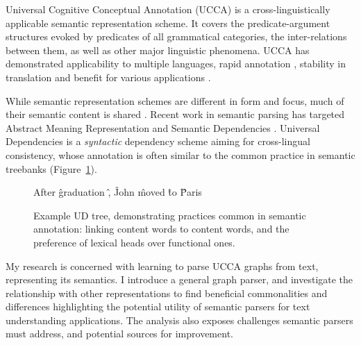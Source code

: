 \documentclass[12pt]{report}
\begin{document}
Universal Cognitive Conceptual Annotation (UCCA)
is a cross-linguistically applicable semantic representation scheme.
It covers the predicate-argument
structures evoked by predicates of all grammatical categories, the inter-relations between them,
as well as other major linguistic phenomena.
UCCA has demonstrated applicability to multiple languages,
rapid annotation \cite{abend2017uccaapp},
stability in translation \cite{sulem2015conceptual}
and benefit for various applications
\cite{birch2016hume,choshen2018usim,sulem2018samsa,sulem2018simple}.

While semantic representation schemes are different in form and focus,
much of their semantic content is shared \cite{abend2017state}.
Recent work in semantic parsing has targeted
Abstract Meaning Representation \cite{banarescu2013abstract} and
Semantic Dependencies \cite{oepen2016towards}.
Universal Dependencies \cite{nivre2016universal}
is a \textit{syntactic} dependency scheme aiming for cross-lingual consistency,
whose annotation is often similar to the common practice in semantic treebanks
(Figure~\ref{fig:original_example_ud}).

\begin{figure}[th]
  \centering
    \begin{dependency}[text only label, label style={above,font=\tt}, font=\small]
    \begin{deptext}[column sep=.8em,ampersand replacement=\^]
    After \^ graduation \^ , \^ John \^ moved \^ to \^ Paris \\
    \end{deptext}
    \end{dependency}
\caption{Example UD tree, demonstrating practices common in semantic annotation:
linking content words to content words, and the preference of lexical heads over functional ones.
\label{fig:original_example_ud}}
\end{figure}

My research is concerned with learning to parse UCCA graphs from text, representing its semantics.
I introduce a general graph parser,
and investigate the relationship with other representations to find beneficial commonalities and
differences highlighting the potential utility of semantic parsers for text understanding applications.
The analysis also exposes challenges semantic parsers must address,
and potential sources for improvement.
\end{document}
